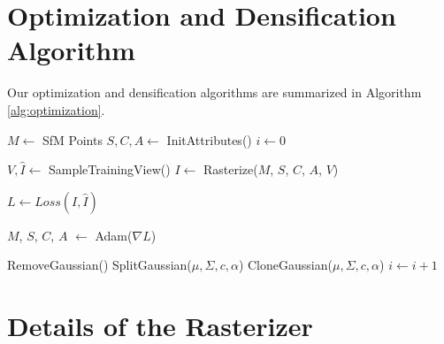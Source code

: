 \begin{appendix}
	\section{Optimization and Densification Algorithm}
	
	Our optimization and densification algorithms are summarized in Algorithm \ref{alg:optimization}.
	\begin{algorithm}[!h]
		\caption{Optimization and Densification\\
		$w$, $h$: width and height of the training images}
		\label{alg:optimization}
		\begin{algorithmic}
			\State $M \gets$ SfM Points	
			\State $S, C, A \gets$ InitAttributes() 
			\State $i \gets 0$	
			
			
			\State $V, \hat{I} \gets$ SampleTrainingView()	
			\State $I \gets$ Rasterize($M$, $S$, $C$, $A$, $V$)	
			
			\State $L \gets Loss(I, \hat{I}) $ 
			
			\State $M$, $S$, $C$, $A$ $\gets$ Adam($\nabla L$) 
			
			
				
			\State RemoveGaussian()	
			\EndIf
			 
				
			\State SplitGaussian($\mu, \Sigma, c, \alpha$)
			\Else								{}
			\State CloneGaussian($\mu, \Sigma, c, \alpha$)
			\EndIf	
			\EndIf
			\EndFor		
			\EndIf
			\State $i \gets i+1$
			\EndWhile
		\end{algorithmic}
	\end{algorithm}
	
	
		
	
	
	
	\section{Details of the Rasterizer}
	\label{app:raster}


\end{appendix}
